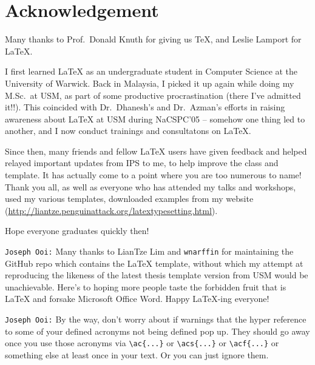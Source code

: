 \chapter{Acknowledgement}

Many thanks to Prof.~Donald Knuth for giving us \TeX, and Leslie Lamport for \LaTeX.  

I first learned \LaTeX{} as an undergraduate student in Computer Science at the University of Warwick. Back in Malaysia, I picked it up again while doing my M.Sc.~at USM, as part of some productive procrastination (there I've admitted it!!). This coincided with Dr.~Dhanesh's and Dr.~Azman's efforts in raising awareness about \LaTeX{} at USM during NaCSPC'05 -- somehow one thing led to another, and I now conduct trainings and consultatons on \LaTeX. \Smiley

Since then, many friends and fellow \LaTeX{} users have given feedback and helped relayed important updates from IPS to me, to help improve the class and template. It has actually come to a point where you are too numerous to name! Thank you all, as well as everyone who has attended my talks and workshops, used my various templates, downloaded examples from my website (\url{http://liantze.penguinattack.org/latextypesetting.html}).

Hope everyone graduates quickly then!

\texttt{Joseph Ooi:} Many thanks to LianTze Lim and \texttt{wnarffin} for maintaining the GitHub repo which contains the \LaTeX{} template, without which my attempt at reproducing the likeness of the latest thesis template version from USM would be unachievable. Here's to hoping more people taste the forbidden fruit that is \LaTeX{} and forsake Microsoft Office Word. Happy \LaTeX{}-ing everyone! 

\texttt{Joseph Ooi:} By the way, don't worry about if warnings that the hyper reference to some of your defined acronyms not being defined pop up. They should go away once you use 
those acronyms via \verb|\ac{...}| or \verb|\acs{...}| or \verb|\acf{...}| or something else at least once in your text. Or you can just ignore them.


